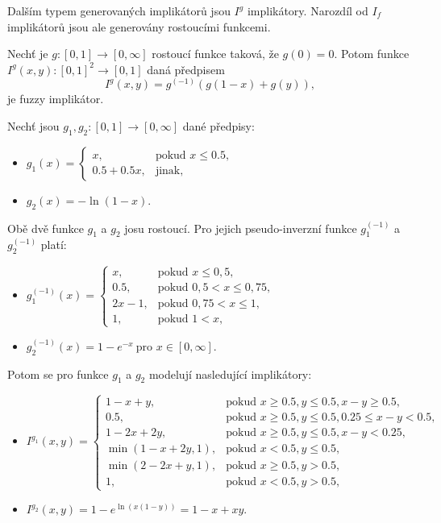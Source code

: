 Dalším typem generovaných implikátor\r u jsou $I^g$ implikátory. Narozdíl od $I_f$ implikátor\r u jsou ale generovány rostoucími funkcemi.

\begin{sentence} \cite{smutna}
    Nech\v t je  $g:[0,1]\rightarrow [0,\infty]$ rostoucí funkce takov\'a, \v ze $g(0)=0$. 
    Potom funkce $I^g(x,y):[0,1]^2 \rightarrow [0,1]$ dan\'a předpisem
    $$I^g(x,y)=g^{(-1)}(g(1-x)+g(y)),$$
    je fuzzy implik\'ator.\\
\end{sentence}

\begin{example}
\cite{Springer}
    Nech\v t jsou $g_1, g_2:[0,1] \rightarrow [0,\infty]$ 
    dan\'e předpisy:
    \begin{itemize}
    \item $g_1(x)=\begin{cases}  x,    &\mbox{pokud $x \leq 0.5$}, \\
    0.5+0.5x,      &\text{jinak,} \end{cases}$
    \item $g_2(x)=-\ln(1-x).$
    \end{itemize}
    Obě dvě funkce $g_1$ a $g_2$ josu rostoucí.
    Pro jejich pseudo-inverzn\'i funkce  $g_1^{(-1)}$ a $g_2^{(-1)}$ plat\'i:
    \begin{itemize}
    \item $g_1^{(-1)}(x)=\begin{cases} x, &\mbox{pokud $x \leq 0,5$}, \\
    0.5,   &\mbox{pokud $0,5 < x \leq 0,75$}, \\
    2x-1,   &\mbox{pokud $0,75 < x \leq 1$}, \\
    1,   &\mbox{pokud $1 < x$}, \end{cases}$
    \item $g_2^{(-1)}(x)=1-e^{-x} ~ \mbox{pro $x \in [0, \infty]$}.$
    \end{itemize}
    Potom se pro funkce $g_1$ a $g_2$ modelují nasleduj\'icí implik\'atory:
    \begin{itemize}
    \item $I^{g_1}(x,y)=\begin{cases}  1-x+y,      &\mbox{pokud $x \geq 0.5, y \leq 0.5, x-y \geq 0.5$}, \\
    0.5,      &\mbox{pokud $x \geq 0.5, y \leq 0.5, 0.25 \leq x-y < 0.5$}, \\
    1-2x+2y,      &\mbox{pokud $x \geq 0.5, y \leq 0.5, x-y < 0.25$}, \\
    \min(1-x+2y,1),       &\mbox{pokud $x < 0.5, y \leq 0.5$}, \\
    \min(2-2x+y,1),       &\mbox{pokud $x \geq 0.5, y>0.5$}, \\
    1,       &\mbox{pokud $x < 0.5, y > 0.5,$} \end{cases}$
    \item $I^{g_2}(x,y)=1-e^{\ln(x(1-y))}=1-x+xy.$
    \end{itemize}
\end{example}

